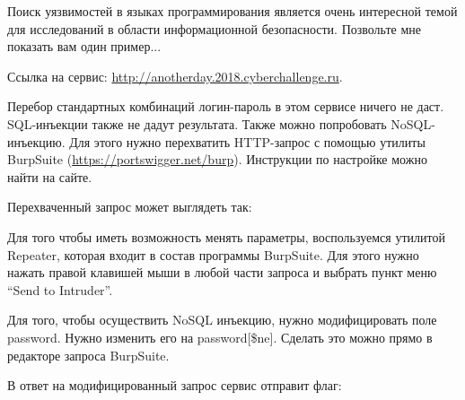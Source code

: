 
Поиск уязвимостей в языках программирования является очень интересной темой для исследований в области информационной безопасности. Позвольте мне показать вам один пример...

Ссылка на сервис: \url{http://anotherday.2018.cyberchallenge.ru}.

\solutionSection

Перебор стандартных комбинаций логин-пароль в этом сервисе ничего не даст. SQL-инъекции также не дадут результата. Также можно попробовать NoSQL-инъекцию. Для этого нужно перехватить HTTP-запрос с помощью утилиты BurpSuite (\url{https://portswigger.net/burp}). Инструкции по настройке можно найти на сайте.

Перехваченный запрос может выглядеть так:


Для того чтобы иметь возможность менять параметры, воспользуемся утилитой Repeater, которая входит в состав программы BurpSuite. Для этого нужно нажать правой клавишей мыши в любой части запроса и выбрать пункт меню “Send to Intruder”.


Для того, чтобы осуществить NoSQL инъекцию, нужно модифицировать поле password. Нужно изменить его на password[\$ne]. Сделать это можно прямо в редакторе запроса BurpSuite.

В ответ на модифицированный запрос сервис отправит флаг:



